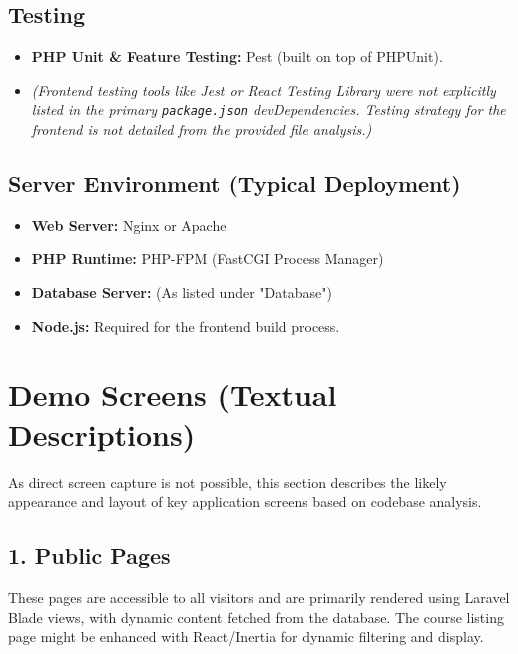 \subsection*{Testing}

\begin{itemize}
    \item \textbf{PHP Unit \& Feature Testing:} Pest (built on top of PHPUnit).
    \item \textit{(Frontend testing tools like Jest or React Testing Library were not explicitly listed in the primary \texttt{package.json} devDependencies. Testing strategy for the frontend is not detailed from the provided file analysis.)}
\end{itemize}

\subsection*{Server Environment (Typical Deployment)}

\begin{itemize}
    \item \textbf{Web Server:} Nginx or Apache
    \item \textbf{PHP Runtime:} PHP-FPM (FastCGI Process Manager)
    \item \textbf{Database Server:} (As listed under "Database")
    \item \textbf{Node.js:} Required for the frontend build process.
\end{itemize}

\section*{Demo Screens (Textual Descriptions)}

As direct screen capture is not possible, this section describes the likely appearance and layout of key application screens based on codebase analysis.

\subsection*{1. Public Pages}

These pages are accessible to all visitors and are primarily rendered using Laravel Blade views, with dynamic content fetched from the database. The course listing page might be enhanced with React/Inertia for dynamic filtering and display.

